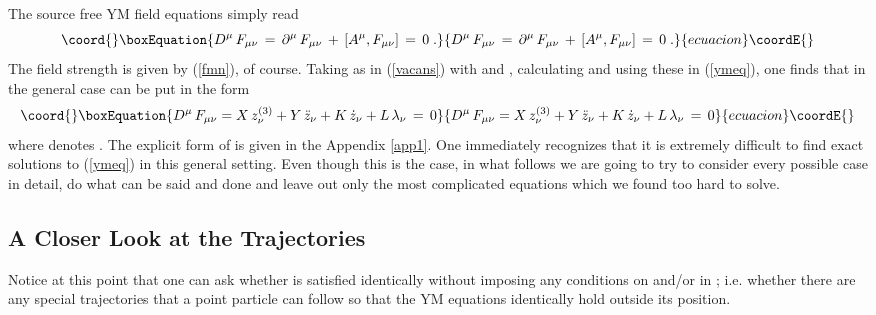\documentclass[a4paper,twocolumn,prd,showpacs,amsmath,amssymb]{revtex4}
\begin{document}
The source free YM field equations simply read
\begin{equation}\coord{}\boxEquation{
D^{\mu} \, F_{\mu\nu} \, = \, \partial^{\mu} \, F_{\mu\nu} \, +
\, [A^{\mu},F_{\mu\nu}] \, = \, 0 \; .
\label{ymeq}
}{
D^{\mu} \, F_{\mu\nu} \, = \, \partial^{\mu} \, F_{\mu\nu} \, +
\, [A^{\mu},F_{\mu\nu}] \, = \, 0 \; .
}{ecuacion}\coordE{}\end{equation}
The field strength is given by (\ref{fmn}), of course. Taking \coordHE{}
as in (\ref{vacans}) with \coordHE{} and \coordHE{},
calculating \coordHE{} and using these in (\ref{ymeq}), one finds that in the
general case \coordHE{} can be put in the form
\begin{equation}\coord{}\boxEquation{
D^{\mu} \, F_{\mu\nu} = X \, z^{(3)}_{\nu} + Y \, \ddot{z}_{\nu}
+ K \, \dot{z}_{\nu} + L \, \lambda_{\nu} \label{xykl} \, = \, 0
}{
D^{\mu} \, F_{\mu\nu} = X \, z^{(3)}_{\nu} + Y \, \ddot{z}_{\nu}
+ K \, \dot{z}_{\nu} + L \, \lambda_{\nu} \, = \, 0
}{ecuacion}\coordE{}\end{equation}
where \coordHE{} denotes \coordHE{}. The explicit form of
\coordHE{} is given in the Appendix \ref{app1}. One immediately
recognizes that it is extremely difficult to find exact solutions to
\coordHE{} (\ref{ymeq}) in this general setting. Even though
this is the case, in what follows we are going to try to consider every
possible case in detail, do what can be said and done and leave out only
the most complicated equations which we found too hard to solve.

\subsection{\label{traj} A Closer Look at the Trajectories}

Notice at this point that one can ask whether \coordHE{} is
satisfied identically without imposing any conditions on \coordHE{} and/or \coordHE{} in
\coordHE{}; i.e. whether there are any special trajectories that a point
particle can follow so that the YM equations identically hold outside its
position.
\end{document}
